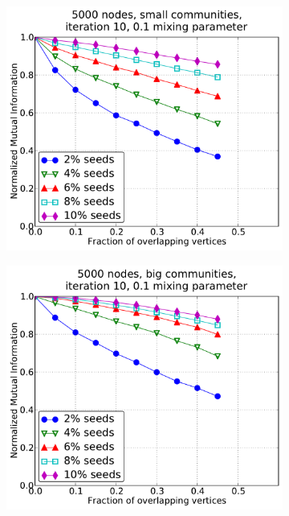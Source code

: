 %
\begin{figure}[h!]
    \centering
    \begin{subfigure}{0.5\textwidth}
    \centering
    \includegraphics[width=\appplotwidth]{plots/overlap_iter_1mu_c.pdf}
    \end{subfigure}%
    \begin{subfigure}{0.5\textwidth}
    \centering
    \includegraphics[width=\appplotwidth]{plots/overlap_iter_1mu_d.pdf}

\end{subfigure}
\end{figure}
